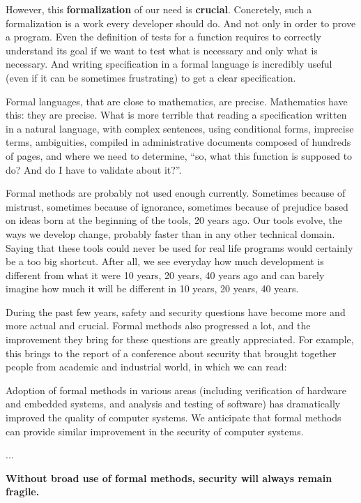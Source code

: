 However, this \textbf{formalization} of our need is \textbf{crucial}.
Concretely, such a formalization is a work every developer should do.
And not only in order to prove a program. Even the definition of tests
for a function requires to correctly understand its goal if we want to
test what is necessary and only what is necessary. And writing
specification in a formal language is incredibly useful (even if it can
be sometimes frustrating) to get a clear specification.

Formal languages, that are close to mathematics, are precise.
Mathematics have this: they are precise. What is more terrible that
reading a specification written in a natural language, with complex
sentences, using conditional forms, imprecise terms, ambiguities,
compiled in administrative documents composed of hundreds of pages, and
where we need to determine, ``so, what this function is supposed to do?
And do I have to validate about it?''.

Formal methods are probably not used enough currently. Sometimes because of
mistrust, sometimes because of ignorance, sometimes because of prejudice
based on ideas born at the beginning of the tools, 20 years ago. Our tools
evolve, the ways we develop change, probably faster than in any other
technical domain. Saying that these tools could never be
used for real life programs would certainly be a too big shortcut. After
all, we see everyday how much development is different from what it were
10 years, 20 years, 40 years ago and can barely imagine how much it will
be different in 10 years, 20 years, 40 years.

During the past few years, safety and security questions have become
more and more actual and crucial. Formal methods also progressed a lot,
and the improvement they bring for these questions are greatly
appreciated. For example, this
 brings to the
report of a conference about security that brought together people from
academic and industrial world, in which we can read:



\begin{Quotation}
Adoption of formal methods in various areas (including verification of hardware
and embedded systems, and analysis and testing of software) has dramatically 
improved the quality of computer systems.  We anticipate that formal methods 
can provide similar improvement in the security of computer systems.

...

\textbf{Without broad use of formal methods, security will always remain fragile.}
\end{Quotation}



